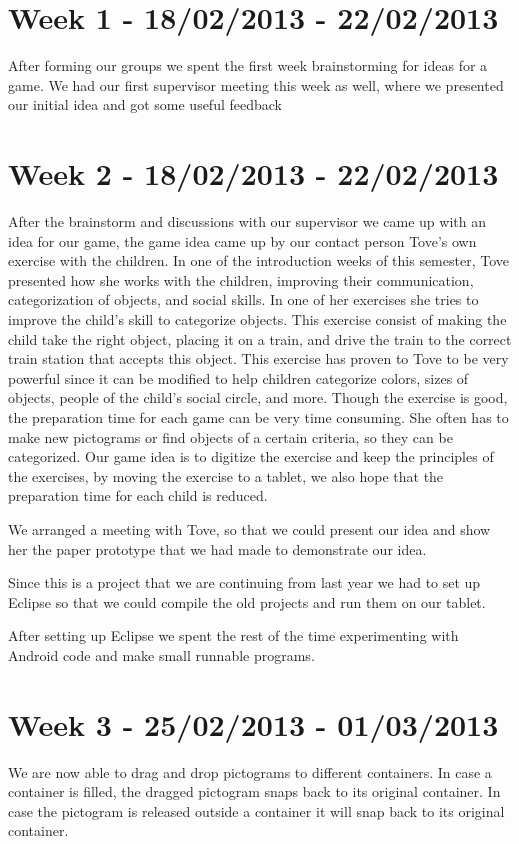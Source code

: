 \section*{Week 1 - 18/02/2013 - 22/02/2013}
After forming our groups we spent the first week brainstorming for ideas for a game. We had our first supervisor meeting this week as well, where we presented our initial idea and got some useful feedback

\section*{Week 2 - 18/02/2013 - 22/02/2013} 
\label{processweek2}
After the brainstorm and discussions with our supervisor we came up with an idea for our game, the game idea came up by our contact person Tove's own exercise with the children. In one of the introduction weeks of this semester, Tove presented how she works with the children, improving their communication, categorization of objects, and social skills. In one of her exercises she tries to improve the child's skill to categorize objects. This exercise consist of making the child take the right object, placing it on a train, and drive the train to the correct train station that accepts this object. This exercise has proven to Tove to be very powerful since it can be modified to help children categorize colors, sizes of objects, people of the child's social circle, and more. Though the exercise is good, the preparation time for each game can be very time consuming. She often has to make new pictograms or find objects of a certain criteria, so they can be categorized. Our game idea is to digitize the exercise and keep the principles of the exercises, by moving the exercise to a tablet, we also hope that the preparation time for each child is reduced.

We arranged a meeting with Tove, so that we could present our idea and show her the paper prototype that we had made to demonstrate our idea.%

Since this is a project that we are continuing from last year we had to set up Eclipse so that we could compile the old projects and run them on our tablet. 

After setting up Eclipse we spent the rest of the time experimenting with Android code and make small runnable programs. 

\section*{Week 3 - 25/02/2013 - 01/03/2013}
We are now able to drag and drop pictograms to different containers. In case a container is filled, the dragged pictogram snaps back to its original container. In case the pictogram is released outside a container it will snap back to its original container. 


